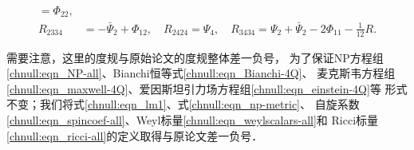 \begin{equation}
\begin{aligned}
        =  \Phi_{22},   \\
        R_{2334} %
        &= -\bar{\Psi}_{2} + \Phi_{12},  \quad
        R_{2424} %
        = \Psi_{4} ,  \quad
        R_{3434} %
        = \Psi_{2} + \bar{\Psi}_2  -2\Phi_{11}- \frac{1}{12} R   .
    \end{aligned}
\end{equation} \setlength{\mathindent}{2em}



需要注意，这里的度规与原始论文的度规\cite{newman-Penrose-1962}整体差一负号，
为了保证NP方程组\eqref{chnull:eqn_NP-all}、Bianchi恒等式\eqref{chnull:eqn_Bianchi-4Q}、
麦克斯韦方程组\eqref{chnull:eqn_maxwell-4Q}、爱因斯坦引力场方程组\eqref{chnull:eqn_einstein-4Q}等
形式不变；我们将式\eqref{chnull:eqn_lm1}、式\eqref{chnull:eqn_np-metric}、
自旋系数\eqref{chnull:eqn_spincoef-all}、Weyl标量\eqref{chnull:eqn_weylscalars-all}和
Ricci标量\eqref{chnull:eqn_ricci-all}的定义取得与原论文\cite{newman-Penrose-1962}差一负号．

